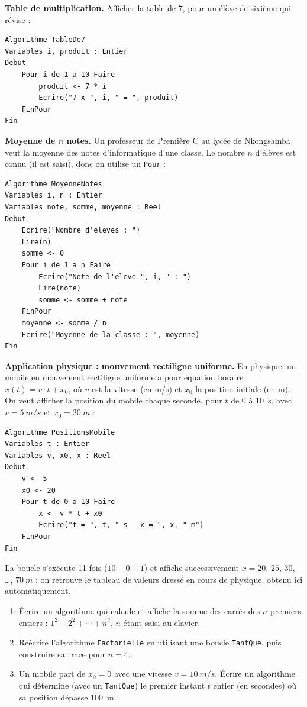 \documentclass[11pt]{article}
\begin{document}
\textbf{Table de multiplication.} Afficher la table de 7, pour un élève de sixième qui révise :
\begin{lstlisting}
Algorithme TableDe7
Variables i, produit : Entier
Debut
    Pour i de 1 a 10 Faire
        produit <- 7 * i
        Ecrire("7 x ", i, " = ", produit)
    FinPour
Fin
\end{lstlisting}

\textbf{Moyenne de $n$ notes.} Un professeur de Première C au lycée de Nkongsamba veut la moyenne des notes d'informatique d'une classe. Le nombre $n$ d'élèves est connu (il est saisi), donc on utilise un \texttt{Pour} :
\begin{lstlisting}
Algorithme MoyenneNotes
Variables i, n : Entier
Variables note, somme, moyenne : Reel
Debut
    Ecrire("Nombre d'eleves : ")
    Lire(n)
    somme <- 0
    Pour i de 1 a n Faire
        Ecrire("Note de l'eleve ", i, " : ")
        Lire(note)
        somme <- somme + note
    FinPour
    moyenne <- somme / n
    Ecrire("Moyenne de la classe : ", moyenne)
Fin
\end{lstlisting}

\textbf{Application physique : mouvement rectiligne uniforme.} En physique, un mobile en mouvement rectiligne uniforme a pour équation horaire $x(t) = v \cdot t + x_0$, où $v$ est la vitesse (en m/s) et $x_0$ la position initiale (en m). On veut afficher la position du mobile chaque seconde, pour $t$ de 0 à \SI{10}{s}, avec $v = \SI{5}{m/s}$ et $x_0 = \SI{20}{m}$ :
\begin{lstlisting}
Algorithme PositionsMobile
Variables t : Entier
Variables v, x0, x : Reel
Debut
    v <- 5
    x0 <- 20
    Pour t de 0 a 10 Faire
        x <- v * t + x0
        Ecrire("t = ", t, " s   x = ", x, " m")
    FinPour
Fin
\end{lstlisting}
La boucle s'exécute 11 fois ($10 - 0 + 1$) et affiche successivement $x = 20$, $25$, $30$, \dots, $\SI{70}{m}$ : on retrouve le tableau de valeurs dressé en cours de physique, obtenu ici automatiquement.

\begin{exercice}
\begin{enumerate}
\item Écrire un algorithme qui calcule et affiche la somme des carrés des $n$ premiers entiers : $1^2 + 2^2 + \cdots + n^2$, $n$ étant saisi au clavier.
\item Réécrire l'algorithme \texttt{Factorielle} en utilisant une boucle \texttt{TantQue}, puis construire sa trace pour $n = 4$.
\item Un mobile part de $x_0 = 0$ avec une vitesse $v = \SI{10}{m/s}$. Écrire un algorithme qui détermine (avec un \texttt{TantQue}) le premier instant $t$ entier (en secondes) où sa position dépasse \SI{100}{m}.
\end{enumerate}
\end{exercice}
\end{document}
